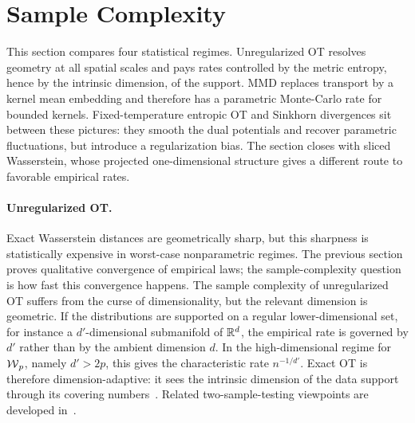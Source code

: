 \section{Sample Complexity}
\label{sec-sample-complexity}

This section compares four statistical regimes. Unregularized OT resolves geometry at all spatial scales and pays rates controlled by the metric entropy, hence by the intrinsic dimension, of the support. MMD replaces transport by a kernel mean embedding and therefore has a parametric Monte-Carlo rate for bounded kernels. Fixed-temperature entropic OT and Sinkhorn divergences sit between these pictures: they smooth the dual potentials and recover parametric fluctuations, but introduce a regularization bias. The section closes with sliced Wasserstein, whose projected one-dimensional structure gives a different route to favorable empirical rates.

\paragraph{Unregularized OT.}
Exact Wasserstein distances are geometrically sharp, but this sharpness is statistically expensive in worst-case nonparametric regimes. The previous section proves qualitative convergence of empirical laws; the sample-complexity question is how fast this convergence happens. The sample complexity of unregularized OT suffers from the curse of dimensionality, but the relevant dimension is geometric. If the distributions are supported on a regular lower-dimensional set, for instance a $d'$-dimensional submanifold of $\mathbb{R}^d$, the empirical rate is governed by $d'$ rather than by the ambient dimension $d$. In the high-dimensional regime for $\operatorname{\mathcal{W}}_p$, namely $d'>2p$, this gives the characteristic rate $n^{-1/d'}$. Exact OT is therefore dimension-adaptive: it sees the intrinsic dimension of the data support through its covering numbers~\cite{dudley1969speed,weed2017sharp}. Related two-sample-testing viewpoints are developed in~\cite{ramdas2017wasserstein}.

